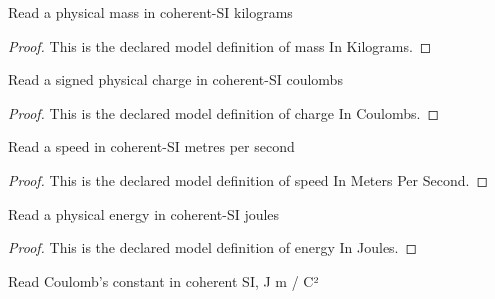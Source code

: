 \begin{definition}
  \label{def:physics:phyx-mini-0853:phyxminiproblems-problemphyxmini0853-massinkilograms}
  Read a physical mass in coherent-SI kilograms
\end{definition}
\begin{proof}
  This is the declared model definition of mass In Kilograms.
\end{proof}
\begin{definition}
  \label{def:physics:phyx-mini-0853:phyxminiproblems-problemphyxmini0853-chargeincoulombs}
  Read a signed physical charge in coherent-SI coulombs
\end{definition}
\begin{proof}
  This is the declared model definition of charge In Coulombs.
\end{proof}
\begin{definition}
  \label{def:physics:phyx-mini-0853:phyxminiproblems-problemphyxmini0853-speedinmeterspersecond}
  Read a speed in coherent-SI metres per second
\end{definition}
\begin{proof}
  This is the declared model definition of speed In Meters Per Second.
\end{proof}
\begin{definition}
  \label{def:physics:phyx-mini-0853:phyxminiproblems-problemphyxmini0853-energyinjoules}
  Read a physical energy in coherent-SI joules
\end{definition}
\begin{proof}
  This is the declared model definition of energy In Joules.
\end{proof}
\begin{definition}
  \label{def:physics:phyx-mini-0853:phyxminiproblems-problemphyxmini0853-coulombconstantinjoulemeterspercoulombsquared}
  Read Coulomb's constant in coherent SI, J m / C²
\end{definition}
